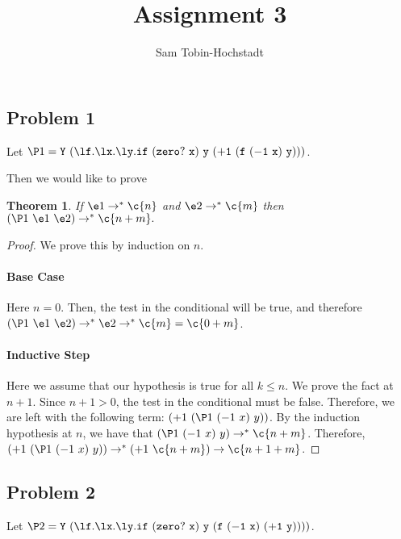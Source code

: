 \documentclass{article}
\newtheorem{theorem}{Theorem}
\begin{document}
\title{Assignment 3}
\author{Sam Tobin-Hochstadt}

\newmeta{}

\maketitle


\subsection*{Problem 1}

Let $\P1 = \mathtt{Y\ (\l f.\l x. \l y.if\ (zero?\ x)\ y\ (+1\ (f\
  (-1\ x)\ y)))}$.

Then we would like to prove

\begin{theorem}
If $\e1 \rightarrow^* \c{n}$ and $\e2 \rightarrow^* \c{m}$ then $(\P1\
\e1\ \e2) \rightarrow^* \c{n+m}.$
\end{theorem}

\begin{proof}
  We prove this by induction on $n$.  

\paragraph{Base Case}  Here $n=0$.  Then, the test in the conditional
will be true, and therefore $(\P1\
\e1\ \e2) \rightarrow^* \e2 \rightarrow^* \c{m} = \c{0+m}$.

\paragraph{Inductive Step} Here we assume that our hypothesis is true
for all $k \leq n$.  We prove the fact at $n+1$.  Since $n+1 > 0$, the
test in the conditional must be false.  Therefore, we are left with
the following term: $(+1\ (\P1\ (-1\ x)\ y))$.  By the induction
hypothesis at $n$, we have that $(\P1\ (-1\ x)\ y) \rightarrow^*
\c{n+m}$.  Therefore,  $(+1\ (\P1\ (-1\ x)\ y)) \rightarrow^* (+1\
\c{n+m}) \rightarrow \c{n+1+m}$.

\end{proof}

\subsection*{Problem 2}


Let $\P2 = \mathtt{Y\ (\l f.\l x. \l y.if\ (zero?\ x)\ y\ (f\
  (-1\ x)\ (+1\ y))))}$.
\end{document}

